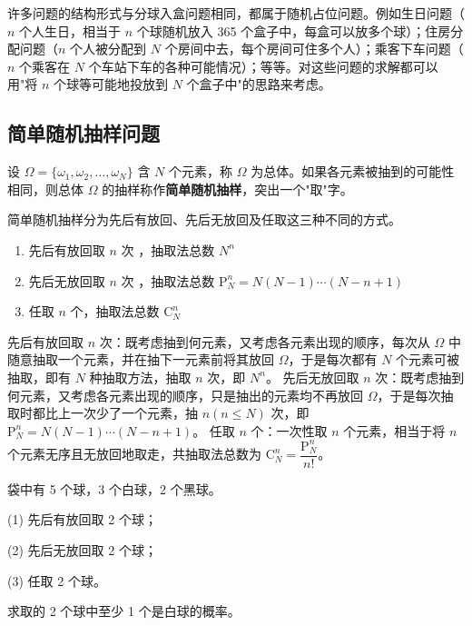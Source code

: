 \documentclass[lang=cn,11pt]{elegantbook}
\begin{document}
\begin{note}
许多问题的结构形式与分球入盒问题相同，都属于随机占位问题。例如生日问题（\(n\) 个人生日，相当于 \(n\) 个球随机放入 365 个盒子中，每盒可以放多个球）；住房分配问题（\(n\) 个人被分配到 \(N\) 个房间中去，每个房间可住多个人）；乘客下车问题（\(n\) 个乘客在 \(N\) 个车站下车的各种可能情况）；等等。对这些问题的求解都可以用"将 \(n\) 个球等可能地投放到 \(N\) 个盒子中"的思路来考虑。
\end{note}

\subsection*{简单随机抽样问题}

设 \(\Omega = \{\omega_1, \omega_2, \dots, \omega_N\}\) 含 \(N\) 个元素，称 \(\Omega\) 为总体。如果各元素被抽到的可能性相同，则总体 \(\Omega\) 的抽样称作\textbf{简单随机抽样}，突出一个"取"字。

简单随机抽样分为先后有放回、先后无放回及任取这三种不同的方式。

\begin{enumerate}
  \item 先后有放回取 \(n\) 次 ，抽取法总数 \(N^n\) 
  \item 先后无放回取 \(n\) 次 ，抽取法总数 \(\mathrm{P}_N^n = N(N-1)\cdots(N-n+1)\)
  \item 任取 \(n\) 个，抽取法总数 \(\mathrm{C}_N^n\)
\end{enumerate}

\begin{note}
先后有放回取 \(n\) 次：既考虑抽到何元素，又考虑各元素出现的顺序，每次从 \(\Omega\) 中随意抽取一个元素，并在抽下一元素前将其放回 \(\Omega\)，于是每次都有 \(N\) 个元素可被抽取，即有 \(N\) 种抽取方法，抽取 \(n\) 次，即 \(N^n\)。\newline
先后无放回取 \(n\) 次：既考虑抽到何元素，又考虑各元素出现的顺序，只是抽出的元素均不再放回 \(\Omega\)，于是每次抽取时都比上一次少了一个元素，抽 \(n(n\le N)\) 次，即 \(\mathrm{P}_N^n = N(N-1)\cdots(N-n+1)\)。\newline
任取 \(n\) 个：一次性取 \(n\) 个元素，相当于将 \(n\) 个元素无序且无放回地取走，共抽取法总数为 \(\mathrm{C}_N^n = \dfrac{\mathrm{P}_N^n}{n!}\)。
\end{note}

\begin{exercise}\label{exer:1-5}
袋中有 5 个球，3 个白球，2 个黑球。\par
(1) 先后有放回取 2 个球；\par
(2) 先后无放回取 2 个球；\par
(3) 任取 2 个球。\par
求取的 2 个球中至少 1 个是白球的概率。
\end{exercise}
\end{document}
